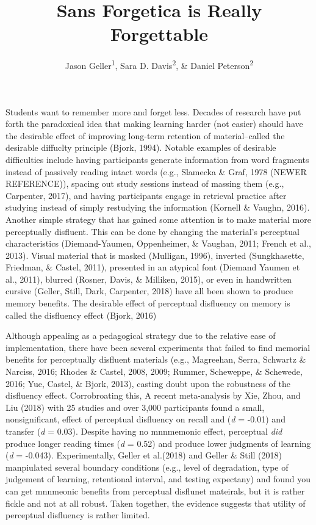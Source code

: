 \documentclass[pdf]{apa6}
\affiliation{
\vspace{0.5cm}
\textsuperscript{1} University of Iowa\\\textsuperscript{2} Skidmore College}
\title{Sans Forgetica is Really Forgettable}
\author{Jason Geller\textsuperscript{1}, Sara D. Davis\textsuperscript{2}, \& Daniel Peterson\textsuperscript{2}}
\date{}
\begin{document}
\maketitle

Students want to remember more and forget less. Decades of research have put forth the paradoxical idea that making learning harder (not easier) should have the desirable effect of improving long-term retention of material--called the desirable diffuclty principle (Bjork, 1994). Notable examples of desirable difficulties include having participants generate information from word fragments instead of passively reading intact words (e.g., Slamecka \& Graf, 1978 (NEWER REFERENCE)), spacing out study sessions instead of massing them (e.g., Carpenter, 2017), and having participants engage in retrieval practice after studying instead of simply restudying the information (Kornell \& Vaughn, 2016). Another simple strategy that has gained some attention is to make material more perceptually disfluent. This can be done by changing the material's perceptual characteristics (Diemand-Yaumen, Oppenheimer, \& Vaughan, 2011; French et al., 2013). Visual material that is masked (Mulligan, 1996), inverted (Sungkhasette, Friedman, \& Castel, 2011), presented in an atypical font (Diemand Yaumen et al., 2011), blurred (Rosner, Davis, \& Milliken, 2015), or even in handwritten cursive (Geller, Still, Dark, Carpenter, 2018) have all been shown to produce memory benefits. The desirable effect of perceptual disfluency on memory is called the disfluency effect (Bjork, 2016)

Although appealing as a pedagogical strategy due to the relative ease of implementation, there have been several experiments that failed to find memorial benefits for perceptually disfluent materials (e.g., Magreehan, Serra, Schwartz \& Narciss, 2016; Rhodes \& Castel, 2008, 2009; Rummer, Scheweppe, \& Schewede, 2016; Yue, Castel, \& Bjork, 2013), casting doubt upon the robustness of the disfluency effect. Corrobroating this, A recent meta-analysis by Xie, Zhou, and Liu (2018) with 25 studies and over 3,000 participants found a small, nonsignificant, effect of perceptual disfluency on recall and (\emph{d} = -0.01) and transfer (\emph{d} = 0.03). Despite having no mnnmemonic effect, perceptual \emph{did} produce longer reading times (\emph{d} = 0.52) and produce lower judgments of learning (\emph{d} = -0.043). Experimentally, Geller et al.(2018) and Geller \& Still (2018) manpiulated several boundary conditions (e.g., level of degradation, type of judgement of learning, retentional interval, and testing expectany) and found you can get mnnmeonic benefits from perceptual disflunet mateirals, but it is rather fickle and not at all robust. Taken together, the evidence suggests that utility of perceptual disfluency is rather limited.
\end{document}
